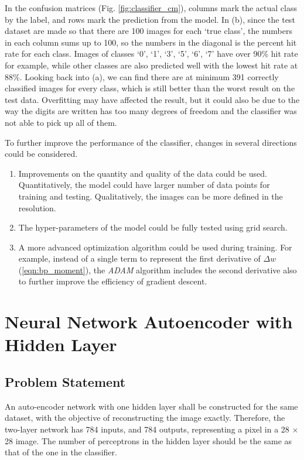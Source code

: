 \documentclass[11pt,titlepage]{article}
\begin{document}
In the confusion matrices (Fig. \ref{fig:classifier_cm}), columns mark the actual class by the label, and rows mark the prediction from the model. In (b), since the test dataset are made so that there are 100 images for each `true class', the numbers in each column sums up to 100, so the numbers in the diagonal is the percent hit rate for each class. Images of classes `0', `1', `3', `5', `6', `7' have over 90\% hit rate for example, while other classes are also predicted well with the lowest hit rate at 88\%. Looking back into (a), we can find there are at minimum 391 correctly classified images for every class, which is still better than the worst result on the test data. Overfitting may have affected the result, but it could also be due to the way the digits are written has too many degrees of freedom and the classifier was not able to pick up all of them. 

To further improve the performance of the classifier, changes in several directions could be considered. 
\begin{enumerate}[label=\alph*.]
	\item Improvements on the quantity and quality of the data could be used. Quantitatively, the model could have larger number of data points for training and testing. Qualitatively, the images can be more defined in the resolution.
	\item The hyper-parameters of the model could be fully tested using grid search. 
	\item A more advanced optimization algorithm could be used during training. For example, instead of a single term to represent the first derivative of $\Delta w$ (\ref{eqn:bp_moment}), the \textit{ADAM} algorithm includes the second derivative also to further improve the efficiency of gradient descent.

\end{enumerate}

\newpage
\section{Neural Network Autoencoder with Hidden Layer}
\subsection{Problem Statement}

An auto-encoder network with one hidden layer shall be constructed for the same dataset, with the objective of reconstructing the image exactly. Therefore, the two-layer network has 784 inputs, and 784 outputs, representing a pixel in a 28 $\times$ 28 image. The number of perceptrons in the hidden layer should be the same as that of the one in the classifier. 
\end{document}
